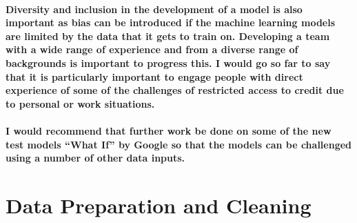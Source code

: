 \documentclass[
]{article}
\begin{document}
\hypertarget{diversity-and-inclusion-in-the-development-of-a-model-is-also-important-as-bias-can-be-introduced-if-the-machine-learning-models-are-limited-by-the-data-that-it-gets-to-train-on.-developing-a-team-with-a-wide-range-of-experience-and-from-a-diverse-range-of-backgrounds-is-important-to-progress-this.-i-would-go-so-far-to-say-that-it-is-particularly-important-to-engage-people-with-direct-experience-of-some-of-the-challenges-of-restricted-access-to-credit-due-to-personal-or-work-situations.}{%
\paragraph{Diversity and inclusion in the development of a model is also
important as bias can be introduced if the machine learning models are
limited by the data that it gets to train on. Developing a team with a
wide range of experience and from a diverse range of backgrounds is
important to progress this. I would go so far to say that it is
particularly important to engage people with direct experience of some
of the challenges of restricted access to credit due to personal or work
situations.}\label{diversity-and-inclusion-in-the-development-of-a-model-is-also-important-as-bias-can-be-introduced-if-the-machine-learning-models-are-limited-by-the-data-that-it-gets-to-train-on.-developing-a-team-with-a-wide-range-of-experience-and-from-a-diverse-range-of-backgrounds-is-important-to-progress-this.-i-would-go-so-far-to-say-that-it-is-particularly-important-to-engage-people-with-direct-experience-of-some-of-the-challenges-of-restricted-access-to-credit-due-to-personal-or-work-situations.}}

\hypertarget{i-would-recommend-that-further-work-be-done-on-some-of-the-new-test-models-what-if-by-google-so-that-the-models-can-be-challenged-using-a-number-of-other-data-inputs.}{%
\paragraph{I would recommend that further work be done on some of the
new test models ``What If'' by Google so that the models can be
challenged using a number of other data
inputs.}\label{i-would-recommend-that-further-work-be-done-on-some-of-the-new-test-models-what-if-by-google-so-that-the-models-can-be-challenged-using-a-number-of-other-data-inputs.}}

\hypertarget{data-preparation-and-cleaning}{%
\section{Data Preparation and
Cleaning}\label{data-preparation-and-cleaning}}
\end{document}
